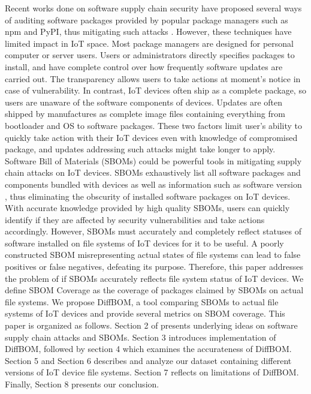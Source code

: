 Recent works done on software supply chain security have proposed several ways of auditing software packages provided by popular package managers such as npm and PyPI, thus mitigating such attacks \cite{Taxonomy, Towards_Measure, Towards_Using, What_are_npm, Phantom_artifacts}. However, these techniques have limited impact in IoT space. Most package managers are designed for personal computer or server users. Users or administrators directly specifies packages to install, and have complete control over how frequently software updates are carried out. The transparency allows users to take actions at moment's notice in case of vulnerability. In contrast, IoT devices often ship as a complete package, so users are unaware of the software components of devices. Updates are often shipped by manufactures as complete image files containing everything from bootloader and OS to software packages. These two factors limit user's ability to quickly take action with their IoT devices even with knowledge of compromised package, and updates addressing such attacks might take longer to apply.
Software Bill of Materials (SBOMs) could be powerful tools in mitigating supply chain attacks on IoT devices. SBOMs exhaustively list all software packages and components bundled with devices as well as information such as software version \cite{What_is_a_sbom}, thus eliminating the obscurity of installed software packages on IoT devices. With accurate knowledge provided by high quality SBOMs, users can quickly identify if they are affected by security vulnerabilities and take actions accordingly. However, SBOMs must accurately and completely reflect statuses of software installed on file systems of IoT devices for it to be useful. A poorly constructed SBOM misrepresenting actual states of file systems can lead to false positives or false negatives, defeating its purpose.
Therefore, this paper addresses the problem of if SBOMs accurately reflects file system status of IoT devices. We define SBOM Coverage as the coverage of packages claimed by SBOMs on actual file systems. We propose DiffBOM, a tool comparing SBOMs to actual file systems of IoT devices and provide several metrics on SBOM coverage.
This paper is organized as follows. Section 2 of presents underlying ideas on software supply chain attacks and SBOMs. Section 3 introduces implementation of DiffBOM, followed by section 4 which examines the accurateness of DiffBOM. Section 5 and Section 6 describes and analyze our dataset containing different versions of IoT device file systems. Section 7 reflects on limitations of DiffBOM. Finally, Section 8 presents our conclusion.

